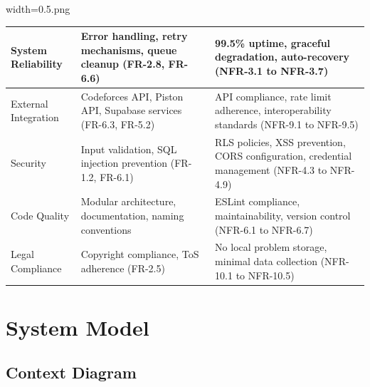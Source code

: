 width=0.5\linewidthimage.png\documentclass[12pt,a4paper]{article}
\begin{document}
\begin{longtable}{|p{3cm}|p{5cm}|p{5cm}|}
System Reliability & Error handling, retry mechanisms, queue cleanup (FR-2.8, FR-6.6) & 99.5\% uptime, graceful degradation, auto-recovery (NFR-3.1 to NFR-3.7) \\
\hline

External Integration & Codeforces API, Piston API, Supabase services (FR-6.3, FR-5.2) & API compliance, rate limit adherence, interoperability standards (NFR-9.1 to NFR-9.5) \\
\hline

Security & Input validation, SQL injection prevention (FR-1.2, FR-6.1) & RLS policies, XSS prevention, CORS configuration, credential management (NFR-4.3 to NFR-4.9) \\
\hline

Code Quality & Modular architecture, documentation, naming conventions & ESLint compliance, maintainability, version control (NFR-6.1 to NFR-6.7) \\
\hline

Legal Compliance & Copyright compliance, ToS adherence (FR-2.5) & No local problem storage, minimal data collection (NFR-10.1 to NFR-10.5) \\
\hline

\end{longtable}

\section{System Model}

\subsection{Context Diagram}
\end{document}
